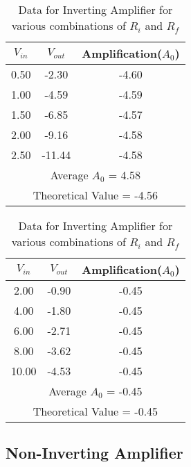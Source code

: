 \documentclass[12pt]{article}
\begin{document}
\begin{table}[H]
  \bigskip
  \bigskip

  \begin{subtable}{0.48\textwidth}
    \centering
    \begin{tabular}{|c|c|c|}
        \hline
        $V_{in}$ & $V_{out}$ & Amplification($A_0$) \\
        \hline
        0.50 & -2.30 & -4.60 \\
        1.00 & -4.59 & -4.59 \\
        1.50 & -6.85 & -4.57 \\
        2.00 & -9.16 & -4.58 \\
        2.50 & -11.44 & -4.58 \\
        \hline
        \multicolumn{3}{|c|}{Average $A_0$ = 4.58} \\
        \multicolumn{3}{|c|}{Theoretical Value = -4.56} \\
        \hline
    \end{tabular}
    \caption{$R_i=2160\Omega, R_f=9850\Omega$}
    \label{tab:first}
\end{subtable}
\hfill
\begin{subtable}{0.48\textwidth}
    \centering
    \begin{tabular}{|c|c|c|}
        \hline
        $V_{in}$ & $V_{out}$ & Amplification($A_0$) \\
        \hline
        2.00 & -0.90 & -0.45 \\
        4.00 & -1.80 & -0.45 \\
        6.00 & -2.71 & -0.45 \\
        8.00 & -3.62 & -0.45 \\
        10.00 & -4.53 & -0.45 \\
        \hline
        \multicolumn{3}{|c|}{Average $A_0$ = -0.45} \\
        \multicolumn{3}{|c|}{Theoretical Value = -0.45} \\
        \hline
    \end{tabular}
    \caption{$R_i=21800\Omega, R_f=9850\Omega$}
    \label{tab:second}
    \end{subtable}
  \caption{Data for Inverting Amplifier for various combinations of $R_i$ and $R_f$}
  \label{tab:combined}
\end{table}

\subsection*{Non-Inverting Amplifier}
\end{document}
